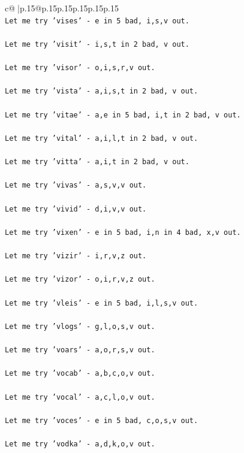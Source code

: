 \documentclass{article}
\begin{document}
{\begin{supertabular}{c@{$\;$}|p{.15\linewidth}@{}p{.15\linewidth}p{.15\linewidth}p{.15\linewidth}p{.15\linewidth}p{.15\linewidth}}
{{{\\ 
\texttt{Let me try 'vises' {-} e in 5 bad, i,s,v out. } \\
\\ 
\texttt{Let me try 'visit' {-} i,s,t in 2 bad, v out. } \\
\\ 
\texttt{Let me try 'visor' {-} o,i,s,r,v out. } \\
\\ 
\texttt{Let me try 'vista' {-} a,i,s,t in 2 bad, v out. } \\
\\ 
\texttt{Let me try 'vitae' {-} a,e in 5 bad, i,t in 2 bad, v out. } \\
\\ 
\texttt{Let me try 'vital' {-} a,i,l,t in 2 bad, v out. } \\
\\ 
\texttt{Let me try 'vitta' {-} a,i,t in 2 bad, v out. } \\
\\ 
\texttt{Let me try 'vivas' {-} a,s,v,v out. } \\
\\ 
\texttt{Let me try 'vivid' {-} d,i,v,v out. } \\
\\ 
\texttt{Let me try 'vixen' {-} e in 5 bad, i,n in 4 bad, x,v out. } \\
\\ 
\texttt{Let me try 'vizir' {-} i,r,v,z out. } \\
\\ 
\texttt{Let me try 'vizor' {-} o,i,r,v,z out. } \\
\\ 
\texttt{Let me try 'vleis' {-} e in 5 bad, i,l,s,v out. } \\
\\ 
\texttt{Let me try 'vlogs' {-} g,l,o,s,v out. } \\
\\ 
\texttt{Let me try 'voars' {-} a,o,r,s,v out. } \\
\\ 
\texttt{Let me try 'vocab' {-} a,b,c,o,v out. } \\
\\ 
\texttt{Let me try 'vocal' {-} a,c,l,o,v out. } \\
\\ 
\texttt{Let me try 'voces' {-} e in 5 bad, c,o,s,v out. } \\
\\ 
\texttt{Let me try 'vodka' {-} a,d,k,o,v out. } \\
}}}
\end{supertabular}}
\end{document}
